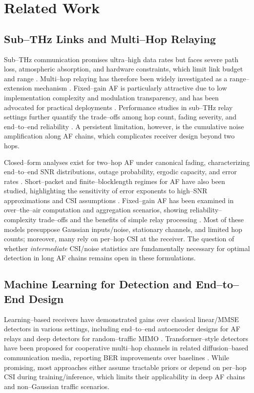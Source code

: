 \documentclass[journal]{IEEEtran}
\begin{document}
\section{Related Work}
\label{sec:related_work}

\subsection{Sub–THz Links and Multi–Hop Relaying}
Sub–THz communication promises ultra–high data rates but faces severe path loss, atmospheric absorption, and hardware constraints, which limit link budget and range \cite{rappaport2019wireless,koenig2013wireless}. Multi–hop relaying has therefore been widely investigated as a range–extension mechanism \cite{goldsmith2005wireless,boulogeorgos2018terahertz}. Fixed–gain AF is particularly attractive due to low implementation complexity and modulation transparency, and has been advocated for practical deployments \cite{bhardwaj2022fixed}. Performance studies in sub–THz relay settings further quantify the trade–offs among hop count, fading severity, and end–to–end reliability \cite{pai2022performance}. A persistent limitation, however, is the cumulative noise amplification along AF chains, which complicates receiver design beyond two hops.

Closed–form analyses exist for two–hop AF under canonical fading, characterizing end–to–end SNR distributions, outage probability, ergodic capacity, and error rates \cite{qin2019performance}. Short–packet and finite–blocklength regimes for AF have also been studied, highlighting the sensitivity of error exponents to high–SNR approximations and CSI assumptions \cite{gu2017short}. Fixed–gain AF has been examined in over–the–air computation and aggregation scenarios, showing reliability–complexity trade–offs and the benefits of simple relay processing \cite{tang2020reliable}. Most of these models presuppose Gaussian inputs/noise, stationary channels, and limited hop counts; moreover, many rely on per–hop CSI at the receiver. The question of whether \emph{intermediate} CSI/noise statistics are fundamentally necessary for optimal detection in long AF chains remains open in these formulations.

\subsection{Machine Learning for Detection and End–to–End Design}
Learning–based receivers have demonstrated gains over classical linear/MMSE detectors in various settings, including end–to–end autoencoder designs for AF relays \cite{gupta2022endtoend} and deep detectors for random–traffic MIMO \cite{sun2020machine}. Transformer–style detectors have been proposed for cooperative multi–hop channels in related diffusion–based communication media, reporting BER improvements over baselines \cite{xu2021deep}. While promising, most approaches either assume tractable priors or depend on per–hop CSI during training/inference, which limits their applicability in deep AF chains and non–Gaussian traffic scenarios.
\end{document}
